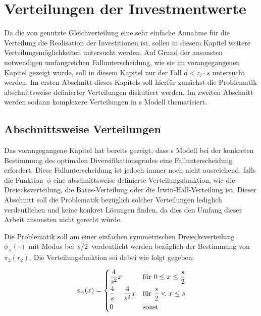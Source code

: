 
\chapter{Verteilungen der Investmentwerte}%
\label{chap:other}

Da die von \citeauthor{Wagner-2010} genutzte Gleichverteilung eine sehr einfache Annahme für die Verteilung die Realisation der Investitionen ist, sollen in diesem Kapitel weitere Verteilungsmöglichkeiten untersucht werden. Auf Grund der ansonsten notwendigen umfangreichen Fallunterscheidung, wie sie im vorangegangenen Kapitel gezeigt wurde, soll in diesem Kapitel nur der Fall $d\!<\!r_i \cdot s$ untersucht werden. Im ersten Abschnitt dieses Kapitels soll hierfür zunächst die Problematik abschnittsweise definierter Verteilungen diskutiert werden. Im zweiten Abschnitt werden sodann komplexere Verteilungen in \citeauthor{Wagner-2010}s Modell thematisiert.

\section{Abschnittsweise Verteilungen}%
\label{sec:other:piece_wise}

Das vorangegangene Kapitel hat bereits gezeigt, dass \citeauthor{Wagner-2010}s Modell bei der konkreten Bestimmung des optimalen Diversifikationsgrades eine Fallunterscheidung erfordert. Diese Fallunterscheidung ist jedoch immer noch nicht ausreichend, falls die Funktion~$\phi$ eine abschnittsweise definierte Verteilungsfunktion, wie \zb{} die Dreiecksverteilung, die Bates-Verteilung oder die Irwin-Hall-Verteilung ist. Dieser Abschnitt soll die Problematik bezüglich solcher Verteilungen lediglich verdeutlichen und keine konkret Lösungen finden, da dies den Umfang dieser Arbeit ansonsten nicht gerecht würde.

Die Problematik soll am einer einfachen symmetrischen Dreiecksverteilung $\phi_\wedge(\cdot)$ mit Modus bei $\flatfrac{s}{2}$ verdeutlicht werden bezüglich der Bestimmung von $\pi_2(r_2)$. Die Verteilungsfunktion sei dabei wie folgt gegeben:

\begin{equation}
	\phi_\wedge(x) = \begin{dcases}
		\frac{4}{s^2}x               & \text{für } 0 \leq x \leq \frac{s}{2} \\
		\frac{4}{s} - \frac{4}{s^2}x & \text{für } \frac{s}{2} < x \leq s    \\
		0                            & \text{sonst}
	\end{dcases} \label{eqn:def:triangular_distribution}
\end{equation}

